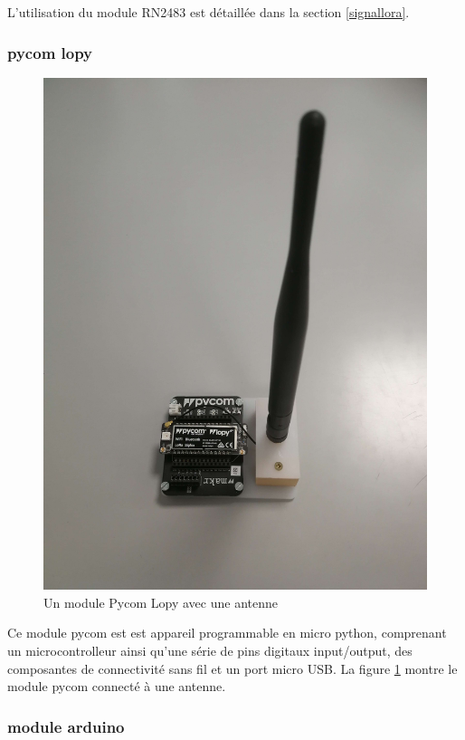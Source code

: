 L'utilisation du module RN2483 est détaillée dans la section \ref{signallora}.

\subsubsection{pycom lopy}

\begin{figure}[h]
\centering

\includegraphics[scale=0.08]{images/lopy.png}
\caption{Un module Pycom Lopy avec une antenne}\label{term35}
\end{figure}

Ce module pycom est est appareil programmable en micro python, comprenant un microcontrolleur ainsi qu'une série de pins digitaux input/output,  des composantes de connectivité sans fil et un port micro USB. La figure \ref{term35} montre le module pycom connecté à une antenne.

\subsubsection{module arduino}

